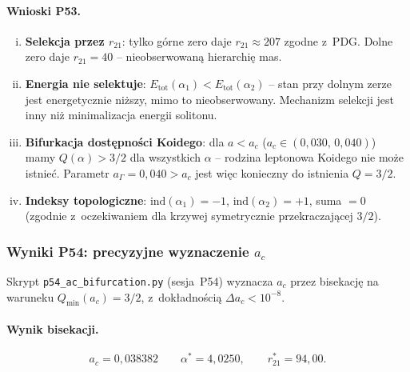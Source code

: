 \paragraph{Wnioski P53.}
\begin{enumerate}[(i)]
  \item \textbf{Selekcja przez $r_{21}$}: tylko g\'orne zero daje
        $r_{21}\approx207$ zgodne z~PDG.
        Dolne zero daje $r_{21}=40$ -- nieobserwowan\k{a} hierarchi\k{e} mas.
  \item \textbf{Energia nie selektuje}: $E_\mathrm{tot}(\alpha_1)
        < E_\mathrm{tot}(\alpha_2)$ -- stan przy dolnym zerze jest
        energetycznie ni\.zszy, mimo to nieobserwowany.
        Mechanizm selekcji jest inny ni\.z minimalizacja energii solitonu.
  \item \textbf{Bifurkacja dost\k{e}pno\'sci Koidego}:
        dla $a<a_c$ ($a_c\in(0{,}030,\,0{,}040)$) mamy $Q(\alpha)>3/2$
        dla wszystkich $\alpha$ -- rodzina leptonowa Koidego nie mo\.ze
        istnie\'c.
        Parametr $a_\Gamma=0{,}040>a_c$ jest wi\k{e}c konieczny
        do istnienia $Q=3/2$.
  \item \textbf{Indeksy topologiczne}: $\mathrm{ind}(\alpha_1)=-1$,
        $\mathrm{ind}(\alpha_2)=+1$, suma $=0$ (zgodnie z~oczekiwaniem
        dla krzywej symetrycznie przekraczaj\k{a}cej $3/2$).
\end{enumerate}

\subsubsection{Wyniki P54: precyzyjne wyznaczenie $a_c$}%
\label{app:F-P54}

Skrypt \texttt{p54\_ac\_bifurcation.py} (sesja~P54) wyznacza $a_c$ przez
bisekacj\k{e} na waruneku $Q_{\min}(a_c)=3/2$, z~dok\l{}adno\'sci\k{a}
$\Delta a_c < 10^{-8}$.

\paragraph{Wynik bisekacji.}
\begin{equation}\label{eq:p54-ac}
  \boxed{a_c = 0{,}038382}
  \qquad
  \alpha^* = 4{,}0250,
  \qquad
  r_{21}^* = 94{,}00.
\end{equation}

